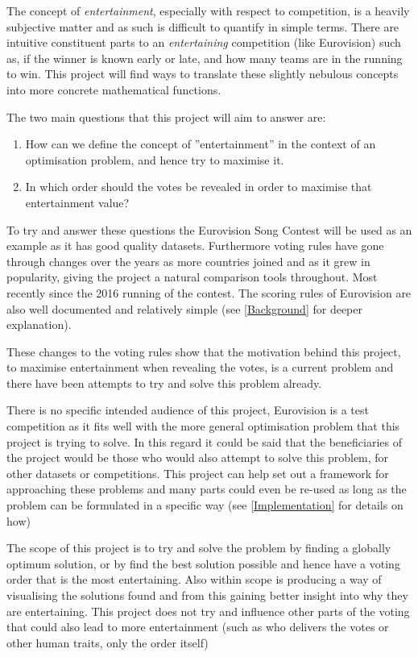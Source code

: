 \documentclass[12pt]{report}
\begin{document}
The concept of \textit{entertainment}, especially with respect to competition, is a heavily subjective matter and as such is difficult to quantify in simple terms. There are intuitive constituent parts to an \textit{entertaining} competition (like Eurovision) such as, if the winner is known early or late, and how many teams are in the running to win. This project will find ways to translate these slightly nebulous concepts into more concrete mathematical functions.  

The two main questions that this project will aim to answer are:

\begin{enumerate}
\item How can we define the concept of ''entertainment'' in the context of an optimisation problem, and hence try to maximise it.
\item  In which order should the votes be revealed in order to maximise that entertainment value?
\end{enumerate}

To try and answer these questions the Eurovision Song Contest will be used as an example as it has good quality datasets. Furthermore voting rules have gone through changes over the years as more countries joined and as it grew in popularity, giving the project a natural comparison tools throughout. Most recently since the 2016 running of the contest. The scoring rules of Eurovision are also well documented and relatively simple (see \ref{Background} for deeper explanation).

These changes to the voting rules show that the motivation behind this project, to maximise entertainment when revealing the votes, is a current problem and there have been attempts to try and solve this problem already.

There is no specific intended audience of this project, Eurovision is a test competition as it fits well with the more general optimisation problem that this project is trying to solve. In this regard it could be said that the beneficiaries of the project would be those who would also attempt to solve this problem, for other datasets or competitions. This project can help set out a framework for approaching these problems and many parts could even be re-used as long as the problem can be formulated in a specific way (see \ref{Implementation} for details on how)

The scope of this project is to try and solve the problem by finding a globally optimum solution, or by find the best solution possible and hence have a voting order that is the most entertaining. Also within scope is producing a way of visualising the solutions found and from this gaining better insight into why they are entertaining. This project does not try and influence other parts of the voting that could also lead to more entertainment (such as who delivers the votes or other human traits, only the order itself)
\end{document}
